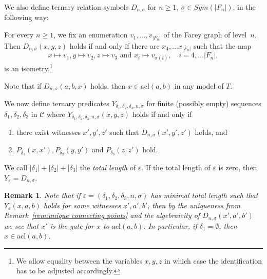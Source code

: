 \documentclass{amsart}
\renewcommand{\d}{\delta}
\renewcommand{\epsilon}{\varepsilon}
\newcommand{\C}{\mathcal{C}}
\newcommand{\acl}{\mathrm{acl}}
\newtheorem{remark}[defi]{Remark}
\begin{document}
We also define ternary relation symbols $D_{n,\sigma}$ for $n\geq 1,\ \sigma\in Sym(|F_n|)$, in the following way:

For every $n\geq 1$, we fix an enumeration $v_1,\ldots, v_{|F_n|}$ of the Farey graph of level~$n$. 
Then $D_{n,\sigma}(x,y,z)$ holds if and only if there are $x_4,\ldots x_{|F_n|}$ such that the map
\[x\mapsto v_1, y\mapsto v_2, z\mapsto v_3\mbox{\  and \ }x_i\mapsto v_{\sigma(i)},\quad i=4,\ldots |F_n|,\] is an isometry.\footnote{We allow equality between the variables $x, y, z$ in which case the identification has to be adjusted accordingly.}



Note that if $D_{n,\sigma}(a,b,x)$ holds, then $x\in\acl(a,b)$ in any model of $T$.

We now define ternary predicates $Y_{\d_1,\d_2,\d_3,n,\sigma}$
for finite (possibly empty) sequences $\d_1,\d_2,\d_3$ in $\C$
where $Y_{\d_1,\d_2,\d_3,n,\sigma}(x,y,z)$ holds
if and only if
\begin{enumerate}

\item there exist witnesses $x',y',z'$ such that $D_{n,\sigma}(x',y',z')$ holds, and
\item $P_{\d_1}(x,x'), P_{\d_2}(y,y')$ and $P_{\d_3}(z,z')$ hold.
\end{enumerate}

We call $|\d_1|+|\d_2|+|\d_3|$ the \emph{total length} of $\epsilon$. If the total length of $\epsilon$ is zero, then $Y_\epsilon=D_{n,\sigma}$.

\begin{remark}\label{rem:Y algebraic}
Note that if $\epsilon=(\d_1,\d_2,\d_3,n,\sigma)$ has minimal total length such that $Y_\epsilon(x,a,b)$ holds for some witnesses $x',a',b'$, then by the uniqueness from Remark~\ref{rem:unique connecting points} and the algebraicity of $D_{n,\sigma}(x',a',b')$  we see that $x'$ is the gate for $x$ to $\acl(a,b)$.
In particular, if $\d_1=\emptyset$, then $x\in\acl(a,b)$.
 
\end{remark}
\end{document}
